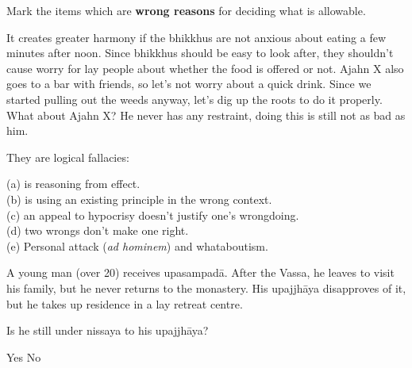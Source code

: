 \begin{exam}{\autoExamName}
\problemDivide

\begin{problem}

  Mark the items which are \textbf{wrong reasons} for deciding what is allowable.

  \bigskip

  \begin{answers}{1}
    \bChoices
     It creates greater harmony if the bhikkhus are not anxious about eating a few minutes after noon. \eAns
     Since bhikkhus should be easy to look after, they shouldn't cause worry for lay people about whether the food is offered or not. \eAns
     Ajahn X also goes to a bar with friends, so let's not worry about a quick drink. \eAns
     Since we started pulling out the weeds anyway, let's dig up the roots to do it properly. \eAns
     What about Ajahn X? He never has any restraint, doing this is still not as bad as him. \eAns
    \eChoices
  \end{answers}

  \begin{solution}
    They are logical fallacies:

    (a) is reasoning from effect.\\
    (b) is using an existing principle in the wrong context.\\
    (c) an appeal to hypocrisy doesn't justify one's wrongdoing.\\
    (d) two wrongs don't make one right.\\
    (e) Personal attack (\emph{ad hominem}) and whataboutism.
  \end{solution}

\end{problem}

\ifnosolutions
\problemDivide
\else
\clearpage
\fi

\begin{problem*}

  A young man (over 20) receives upasampadā. After the Vassa, he leaves to visit his family, but he never returns to the monastery. His upajjhāya disapproves of it, but he takes up residence in a lay retreat centre.

  \begin{parts}

    \item Is he still under nissaya to his upajjhāya?

    \begin{answers}{2}
      \bChoices
       Yes \eAns
       No \eAns
      \eChoices
    \end{answers}


\end{parts}
\end{problem*}
\end{exam}
